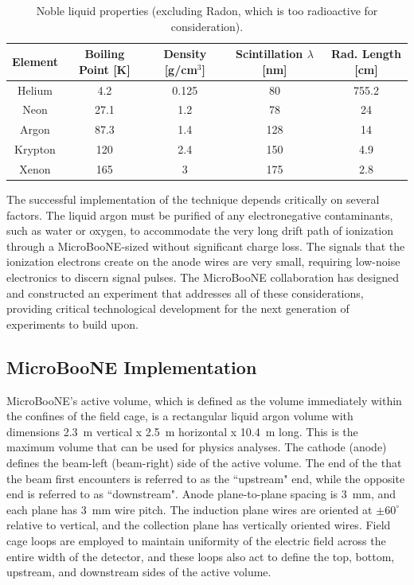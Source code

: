 \begin{table}[!htb]
   \centering
    \caption{Noble liquid properties (excluding Radon, which is too radioactive for consideration).} 
    \begin{tabular}{ccccc} %
    \hline
    Element & Boiling Point [K] & Density [g/cm$^3$] & Scintillation $\lambda$ [nm] & Rad. Length [cm] \\
    \hline
     Helium & 4.2 & 0.125 & 80 & 755.2\\
     Neon &   27.1 & 1.2 & 78 & 24\\	
     Argon &  87.3 & 1.4 & 128 & 14\\
     Krypton & 120 & 2.4 & 150 & 4.9\\
     Xenon & 165 & 3 & 175 & 2.8 \\
    \hline
   \end{tabular}
   \label{tab:nobleparam}
\end{table} 



The successful implementation of the \lartpc technique depends critically on several factors.   The liquid argon must be purified of any electronegative contaminants, such as water or oxygen, to accommodate the very long drift path of ionization through a MicroBooNE-sized \lartpc without significant charge loss.  The signals that the ionization electrons create on the anode wires are very small, requiring low-noise electronics to discern signal pulses.  The MicroBooNE collaboration has designed and constructed an experiment that addresses all of these considerations, providing critical technological development for the next generation of \lartpc experiments to build upon. 

 


\subsection{MicroBooNE \lartpc Implementation}

MicroBooNE's \lartpc active volume, which is defined as the volume immediately within the confines of the \lartpc field cage, is a rectangular liquid argon volume with dimensions 2.3~m vertical x 2.5~m horizontal x 10.4~m long. This is the maximum volume that can be used for physics analyses.  The cathode (anode) defines the beam-left (beam-right) side of the active volume.  The end of the \lartpc that the beam first encounters is referred to as the ``upstream" end, while the opposite end is referred to as ``downstream".  Anode plane-to-plane spacing is 3~mm, and each plane has 3~mm wire pitch. The induction plane wires are oriented at $\pm60^{\circ}$ relative to vertical, and the collection plane has vertically oriented wires. Field cage loops are employed to maintain uniformity of the electric field across the entire width of the detector, and these loops also act to define the top, bottom, upstream, and downstream sides of the active volume.  

